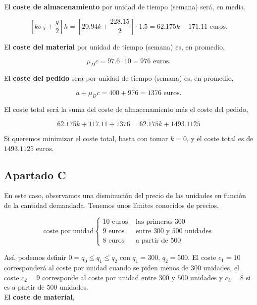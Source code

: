 \documentclass[a4paper,12pt]{article}
\begin{document}
El \textbf{coste de almacenamiento} por unidad de tiempo (semana) ser\'a, en media, 

$$ \left[k\sigma_X + \dfrac{q}{2}\right] h = \left[20.94k + \dfrac{228.15}{2} \right]\cdot 1.5 = 62.175k + 171.11 \text{ euros.}$$

El \textbf{coste del material} por unidad de tiempo (semana) es, en promedio,

$$ \mu_D c = 97.6\cdot 10 = 976 \text{ euros.}$$

El \textbf{coste del pedido} ser\'a por unidad de tiempo (semana) es, en promedio,

$$ a + \mu_D c = 400 + 976 = 1376 \text{ euros.}$$

El coste total ser\'a la suma del coste de almacenamiento m\'as el coste del pedido,

$$ 62.175k + 117.11 + 1376 = 62.175k + 1493.1125$$

Si queremos minimizar el coste total, basta con tomar $k = 0 $, y el coste total es de $1493.1125 \text{ euros.}$

\pagebreak

\subsection{Apartado C}

En este caso, observamos una disminuci\'on del precio de las unidades en funci\'on de la cantidad demandada. Tenemos unos l\'imites conocidos de precios,
     
	\begin{equation*}
	\text{coste por unidad}  \left\lbrace \begin{array}{ll}	  
		10\text{ euros} & \text{ las primeras 300}\\
		9\text{ euros}  & \text{ entre 300 y 500 unidades}\\
		8\text{ euros}  & \text{ a partir de 500}
	\end{array}
	\right. 
	\end{equation*}
	
As\'i, podemos definir $0 = q_0 \leq q_1 \leq q_2$ con $q_1 = 300$, $q_2 = 500$. El coste $c_1 = 10$ corresponder\'a al coste por unidad cuando se piden menos de $300$ unidades, el coste $c_2 = 9$ corresponde al coste por unidad entre $300$ y $500$ unidades y $c_3 = 8$ si es a partir de $500$ unidades.\\

El \textbf{coste de material},
\end{document}
